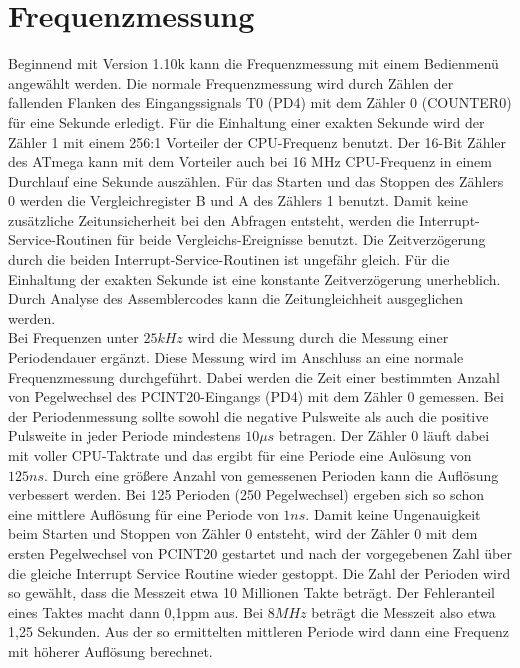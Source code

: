 
\section{Frequenzmessung}
\label{sec:frequency}

Beginnend mit Version 1.10k kann die Frequenzmessung mit einem Bedienmenü angewählt werden.
Die normale Frequenzmessung wird durch Zählen der fallenden Flanken des Eingangssignals T0 (PD4)
mit dem Zähler 0 (COUNTER0) für eine Sekunde erledigt. Für die Einhaltung einer exakten Sekunde
wird der Zähler 1 mit einem 256:1 Vorteiler der CPU-Frequenz benutzt. Der 16-Bit Zähler des ATmega
kann mit dem Vorteiler auch bei 16 MHz CPU-Frequenz in einem Durchlauf eine Sekunde auszählen.
Für das Starten und das Stoppen des Zählers 0 werden die Vergleichregister B und A des Zählers 1
benutzt. Damit keine zusätzliche Zeitunsicherheit bei den Abfragen entsteht, werden die
Interrupt-Service-Routinen für beide Vergleichs-Ereignisse benutzt.
Die Zeitverzögerung durch die beiden Interrupt-Service-Routinen ist ungefähr gleich.
Für die Einhaltung der exakten Sekunde ist eine konstante Zeitverzögerung unerheblich.
Durch Analyse des Assemblercodes kann die Zeitungleichheit ausgeglichen werden.\\

Bei Frequenzen unter \(25 kHz\) wird die Messung durch die Messung einer Periodendauer
ergänzt. Diese Messung wird im Anschluss an eine normale Frequenzmessung durchgeführt.
Dabei werden die Zeit einer bestimmten Anzahl von Pegelwechsel des PCINT20-Eingangs (PD4) 
mit dem Zähler 0 gemessen. 
Bei der Periodenmessung sollte sowohl die negative Pulsweite als auch die positive Pulsweite
in jeder Periode mindestens \(10\mu s\) betragen.
Der Zähler 0 läuft dabei mit voller CPU-Taktrate und das ergibt für eine Periode eine
Aulösung von \(125 ns\). Durch eine größere Anzahl von gemessenen Perioden kann die Auflösung
verbessert werden. Bei 125 Perioden (250 Pegelwechsel) ergeben sich so schon eine mittlere
Auflösung für eine Periode von \(1 ns\). Damit keine Ungenauigkeit beim Starten und
Stoppen von Zähler 0 entsteht, wird der Zähler 0 mit dem ersten Pegelwechsel von
PCINT20 gestartet und nach der vorgegebenen Zahl über die gleiche Interrupt Service Routine
wieder gestoppt.
Die Zahl der Perioden wird so gewählt, dass die Messzeit etwa 10 Millionen Takte beträgt.
Der Fehleranteil eines Taktes macht dann 0,1ppm aus.
Bei \(8MHz\) beträgt die Messzeit also etwa 1,25 Sekunden.
Aus der so ermittelten mittleren Periode wird dann eine Frequenz mit höherer Auflösung berechnet.

